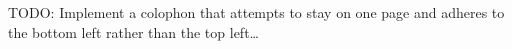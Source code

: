 \documentclass[../book]{subfiles}
\begin{document}
TODO: Implement a colophon that attempts to stay on one page and adheres to the bottom left rather than the top left…

\thispagestyle{empty}
\newepubpage
\end{document}
